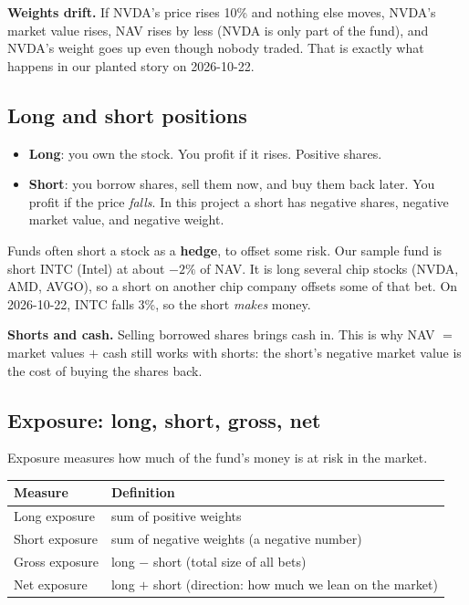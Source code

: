 \documentclass[11pt]{article}
\begin{document}
\textbf{Weights drift.} If NVDA's price rises 10\% and nothing else moves, NVDA's market value
rises, NAV rises by less (NVDA is only part of the fund), and NVDA's weight goes up even
though nobody traded. That is exactly what happens in our planted story on 2026-10-22.

\subsection{Long and short positions}

\begin{itemize}
  \item \textbf{Long}: you own the stock. You profit if it rises. Positive shares.
  \item \textbf{Short}: you borrow shares, sell them now, and buy them back later. You profit
        if the price \emph{falls}. In this project a short has negative shares, negative
        market value, and negative weight.
\end{itemize}

Funds often short a stock as a \textbf{hedge}, to offset some risk. Our sample fund is
short INTC (Intel) at about $-2\%$ of NAV. It is long several chip stocks (NVDA, AMD,
AVGO), so a short on another chip company offsets some of that bet. On 2026-10-22, INTC
falls 3\%, so the short \emph{makes} money.

\textbf{Shorts and cash.} Selling borrowed shares brings cash in. This is why NAV
$=$ market values $+$ cash still works with shorts: the short's negative market value is the
cost of buying the shares back.

\subsection{Exposure: long, short, gross, net}

Exposure measures how much of the fund's money is at risk in the market.

\begin{center}
\begin{tabular}{@{}ll@{}}
\toprule
\textbf{Measure} & \textbf{Definition} \\
\midrule
Long exposure  & sum of positive weights \\
Short exposure & sum of negative weights (a negative number) \\
Gross exposure & long $-$ short \quad (total size of all bets) \\
Net exposure   & long $+$ short \quad (direction: how much we lean on the market) \\
\bottomrule
\end{tabular}
\end{center}
\end{document}

